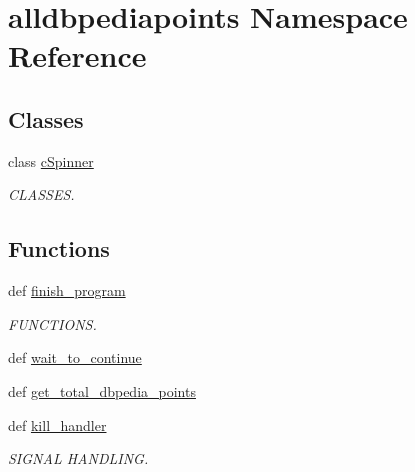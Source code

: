 \hypertarget{namespacealldbpediapoints}{\section{alldbpediapoints \-Namespace \-Reference}
\label{namespacealldbpediapoints}
}
\subsection*{\-Classes}
\begin{DoxyCompactItemize}
\item 
class \hyperlink{classalldbpediapoints_1_1cSpinner}{c\-Spinner}
\begin{DoxyCompactList}\small\item\em \-C\-L\-A\-S\-S\-E\-S. \end{DoxyCompactList}\end{DoxyCompactItemize}
\subsection*{\-Functions}
\begin{DoxyCompactItemize}
\item 
def \hyperlink{namespacealldbpediapoints_aaec8066f21e8feca8af72f06950032ef}{finish\-\_\-program}
\begin{DoxyCompactList}\small\item\em \-F\-U\-N\-C\-T\-I\-O\-N\-S. \end{DoxyCompactList}\item 
def \hyperlink{namespacealldbpediapoints_a8ee0c7095504249e8c8489846e8daa8e}{wait\-\_\-to\-\_\-continue}
\item 
def \hyperlink{namespacealldbpediapoints_ad95dd1eda2480215bd86bdbe7294db2e}{get\-\_\-total\-\_\-dbpedia\-\_\-points}
\item 
def \hyperlink{namespacealldbpediapoints_a144b7a2a48519add54b2a8c8dfd41395}{kill\-\_\-handler}
\begin{DoxyCompactList}\small\item\em \-S\-I\-G\-N\-A\-L \-H\-A\-N\-D\-L\-I\-N\-G. \end{DoxyCompactList}\end{DoxyCompactItemize}
